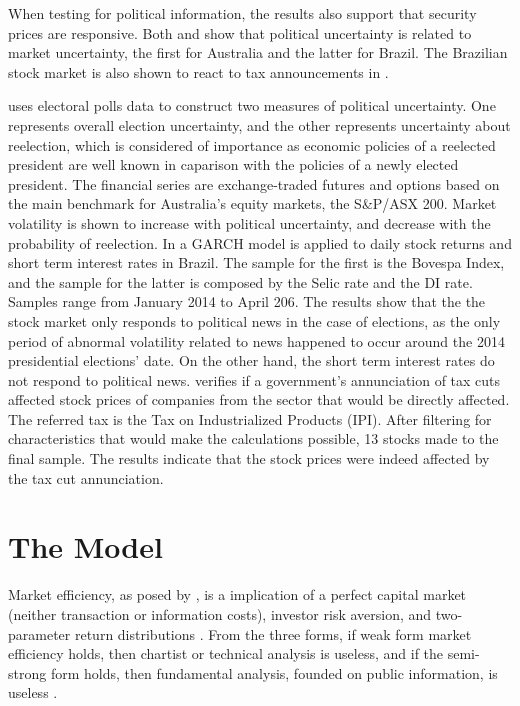 \documentclass[cic,tc, english]{iiufrgs}
\begin{document}
    When testing for political information, the results also support that security prices are responsive. Both \citet{smales2015} and \citet{marquessantos2016} show that political uncertainty is related to market uncertainty, the first for Australia and the latter for Brazil. The Brazilian stock market is also shown to react to tax announcements in \cite{gabrielribeiro2013}.

    \citet{smales2015} uses electoral polls data to construct two measures of political uncertainty. One represents overall election uncertainty, and the other represents uncertainty about reelection, which is considered of importance as economic policies of a reelected president are well known in caparison with the policies of a newly elected president. The financial series are exchange-traded futures and options based on the main benchmark for Australia's equity markets, the S\&P/ASX 200. Market volatility is shown to increase with political uncertainty, and decrease with the probability of reelection.
    In \citet{marquessantos2016} a GARCH model is applied to daily stock returns and short term interest rates in Brazil. The sample for the first is the Bovespa Index, and the sample for the latter is composed by the Selic rate and the DI rate. Samples range from January 2014 to April 206. The results show that the the stock market only responds to political news in the case of elections, as the only period of abnormal volatility related to news happened to occur around the 2014 presidential elections' date. On the other hand, the short term interest rates do not respond to political news.
    \cite{gabrielribeiro2013} verifies if a government's annunciation of tax cuts affected stock prices of companies from the sector that would be directly affected. The referred tax is the Tax on Industrialized Products (IPI). After filtering for characteristics that would make the calculations possible, 13 stocks made to the final sample. The results indicate that the stock prices were indeed affected by the tax cut annunciation.

\chapter{The Model} \label{chapter_model}

    Market efficiency, as posed by \citet{fama1970}, is a implication of a perfect capital market (neither transaction or information costs), investor risk aversion, and two-parameter return distributions \citet{famamcbeth1973}. From the three forms, if weak form market efficiency holds, then chartist or technical analysis is useless, and if the semi-strong form holds, then fundamental analysis, founded on public information, is useless \citet{oprean2012}.
\end{document}

